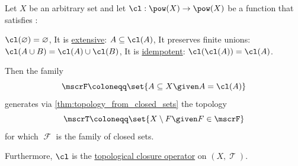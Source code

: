 \begin{proposition}\label{thm:topology_from_closure_operator}
  Let \( X \) be an arbitrary set and let \( \cl: \pow(X) \to \pow(X) \) be a function that satisfies :
  \begin{thmenum}
     \( \cl(\varnothing) = \varnothing \),
     It is \hyperref[def:extensive_function]{extensive}: \( A \subseteq \cl(A) \),
     It preserves finite unions: \( \cl(A \cup B) = \cl(A) \cup \cl(B) \),
     It is \hyperref[def:binary_operation/idempotent]{idempotent}: \( \cl(\cl(A)) = \cl(A) \).
  \end{thmenum}

  Then the family
  \begin{equation*}
    \mscrF \coloneqq \set{ A \subseteq X \given A = \cl(A) }
  \end{equation*}
  generates via \cref{thm:topology_from_closed_sets} the topology
  \begin{equation*}
    \mscrT \coloneqq \set{ X \setminus F \given F \in \mscrF }
  \end{equation*}
  for which \( \mscrF \) is the family of closed sets.

  Furthermore, \( \cl \) is the \hyperref[def:topological_closure_operator]{topological closure operator} on \( (X, \mscrT) \).
\end{proposition}

